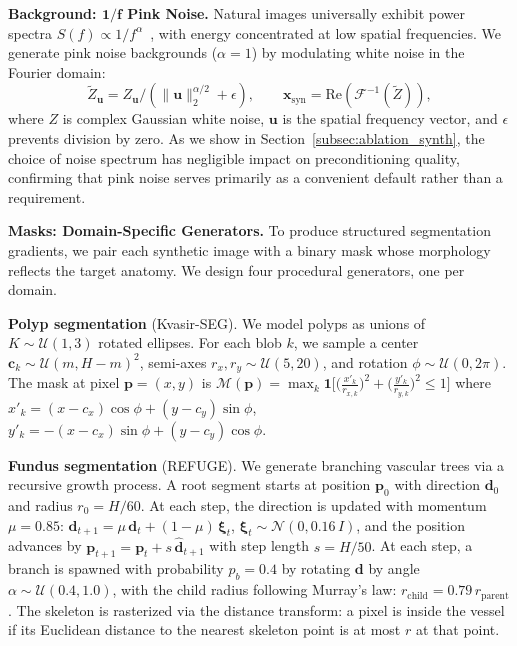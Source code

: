\documentclass[runningheads]{llncs}
\newcommand{\bx}{\mathbf{x}}
\begin{document}
\textbf{Background: $\boldsymbol{1/f}$ Pink Noise.}
Natural images universally exhibit power spectra $S(f)\propto 1/f^\alpha$~\cite{field1987relations}, with energy concentrated at low spatial frequencies. We generate pink noise backgrounds ($\alpha{=}1$) by modulating white noise in the Fourier domain:
\begin{equation}
\label{eq:pink_noise}
\tilde{Z}_{\mathbf{u}} = Z_{\mathbf{u}} / (\|\mathbf{u}\|_2^{\alpha/2} + \epsilon), \qquad
\bx_{\text{syn}} = \text{Re}(\mathcal{F}^{-1}(\tilde{Z})),
\end{equation}
where $Z$ is complex Gaussian white noise, $\mathbf{u}$ is the spatial frequency vector, and $\epsilon$ prevents division by zero. As we show in Section~\ref{subsec:ablation_synth}, the choice of noise spectrum has negligible impact on preconditioning quality, confirming that pink noise serves primarily as a convenient default rather than a requirement.

\textbf{Masks: Domain-Specific Generators.}
To produce structured segmentation gradients, we pair each synthetic image with a binary mask whose morphology reflects the target anatomy. We design four procedural generators, one per domain.

\textbf{Polyp segmentation} (Kvasir-SEG). We model polyps as unions of $K{\sim}\mathcal{U}(1,3)$ rotated ellipses. For each blob $k$, we sample a center $\mathbf{c}_k{\sim}\mathcal{U}(m,H{-}m)^2$, semi-axes $r_x,r_y{\sim}\mathcal{U}(5,20)$, and rotation $\phi{\sim}\mathcal{U}(0,2\pi)$. The mask at pixel $\mathbf{p}{=}(x,y)$ is
$\mathcal{M}(\mathbf{p})=\max_k \mathbf{1}\!\big[\big(\tfrac{x'_k}{r_{x,k}}\big)^{\!2}+\big(\tfrac{y'_k}{r_{y,k}}\big)^{\!2}\leq 1\big]$
where $x'_k{=}(x{-}c_x)\cos\phi{+}(y{-}c_y)\sin\phi$, $y'_k{=}{-}(x{-}c_x)\sin\phi{+}(y{-}c_y)\cos\phi$.

\textbf{Fundus segmentation} (REFUGE). We generate branching vascular trees via a recursive growth process. A root segment starts at position $\mathbf{p}_0$ with direction $\mathbf{d}_0$ and radius $r_0{=}H/60$. At each step, the direction is updated with momentum $\mu{=}0.85$: $\mathbf{d}_{t+1}=\mu\,\mathbf{d}_t+(1{-}\mu)\,\boldsymbol{\xi}_t$, $\boldsymbol{\xi}_t{\sim}\mathcal{N}(0,0.16\,I)$, and the position advances by $\mathbf{p}_{t+1}=\mathbf{p}_t+s\,\hat{\mathbf{d}}_{t+1}$ with step length $s{=}H/50$. At each step, a branch is spawned with probability $p_b{=}0.4$ by rotating $\mathbf{d}$ by angle $\alpha{\sim}\mathcal{U}(0.4,1.0)$, with the child radius following Murray's law: $r_{\text{child}}=0.79\,r_{\text{parent}}$. The skeleton is rasterized via the distance transform: a pixel is inside the vessel if its Euclidean distance to the nearest skeleton point is at most $r$ at that point.
\end{document}
